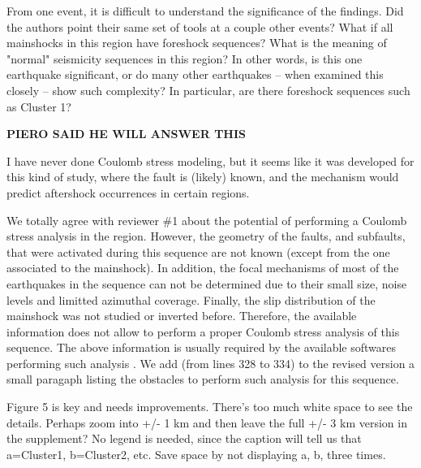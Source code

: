 \documentclass[10pt]{extarticle}
\begin{document}
%
%



\begin{ReviewerComment}{1}
\noindent 
From one event, it is difficult to understand the significance of the findings. Did the authors point their same set of tools at a couple other events? What if all mainshocks in this region have foreshock sequences? What is the meaning of "normal" seismicity sequences in this region? In other words, is this one earthquake significant, or do many other earthquakes -- when examined this closely -- show such complexity? In particular, are there foreshock sequences such as Cluster 1?

\end{ReviewerComment}


\begin{Answer}
\hfill {\bf PIERO SAID HE WILL ANSWER THIS}
 \WorkInProgressRevTask
\end{Answer}
%
%



\begin{ReviewerComment}{1}
\noindent 
I have never done Coulomb stress modeling, but it seems like it was developed for this kind of study, where the fault is (likely) known, and the mechanism would predict aftershock occurrences in certain regions.
\end{ReviewerComment}


\begin{Answer}
We totally agree with reviewer \#1 about the potential of performing a Coulomb stress analysis in the region. However, the geometry of the faults, and subfaults, that were activated during this sequence are not known (except from the one associated to the mainshock). In addition, the focal mechanisms of most of the earthquakes in the sequence can not be determined due to their small size, noise levels and limitted azimuthal coverage. Finally, the slip distribution of the mainshock was not studied or inverted before. Therefore, the available information does not allow to perform a proper Coulomb stress analysis of this sequence. The above information is usually required by the available softwares performing such analysis \citep{toda2011coulomb}. We add (from lines 328 to 334) to the revised version a small paragaph listing the obstacles to perform such analysis for this sequence.
 \WorkInProgressRevTask
\end{Answer}
%
%



\begin{ReviewerComment}{1}
\noindent 
Figure 5 is key and needs improvements. There's too much white space to see the details.  Perhaps zoom into +/- 1 km and then leave the full +/- 3 km version in the supplement? No legend is needed, since the caption will tell us that a=Cluster1, b=Cluster2, etc. Save space by not displaying a, b, three times.
\end{ReviewerComment}
\end{document}
